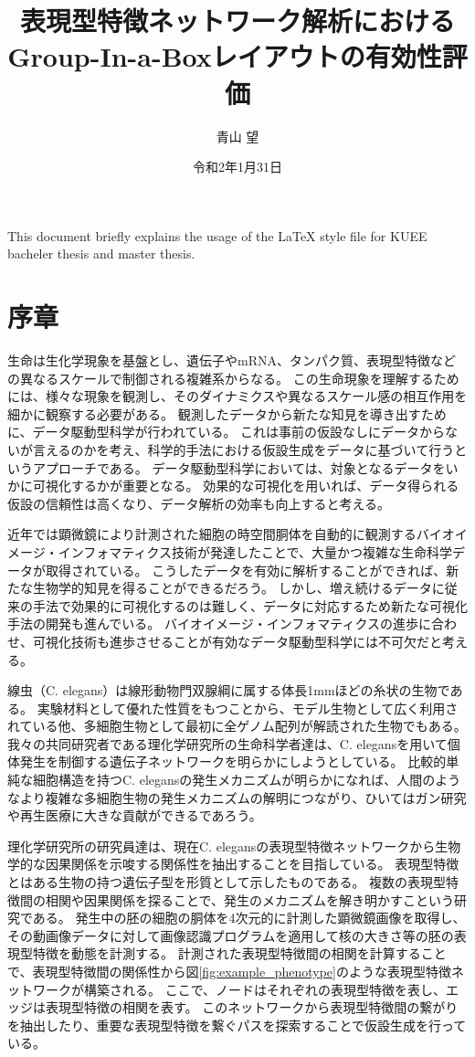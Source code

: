 \documentclass{kuee}
\title{表現型特徴ネットワーク解析におけるGroup-In-a-Boxレイアウトの有効性評価}
\author{青山 望}
\date{令和2年1月31日}
\begin{document}
\maketitle      %
\begin{eabstract}   %
This document briefly explains the usage of the \LaTeX{} style file
for KUEE bacheler thesis and master thesis.
\end{eabstract}
\tableofcontents    %

\chapter{序章}
\label{chap:intro}
生命は生化学現象を基盤とし、遺伝子やmRNA、タンパク質、表現型特徴などの異なるスケールで制御される複雑系からなる。
この生命現象を理解するためには、様々な現象を観測し、そのダイナミクスや異なるスケール感の相互作用を細かに観察する必要がある。
観測したデータから新たな知見を導き出すために、データ駆動型科学が行われている。
これは事前の仮設なしにデータからないが言えるのかを考え、科学的手法における仮設生成をデータに基づいて行うというアプローチである。
データ駆動型科学においては、対象となるデータをいかに可視化するかが重要となる。
効果的な可視化を用いれば、データ得られる仮設の信頼性は高くなり、データ解析の効率も向上すると考える。

近年では顕微鏡により計測された細胞の時空間胴体を自動的に観測するバイオイメージ・インフォマティクス技術が発達したことで、大量かつ複雑な生命科学データが取得されている。
こうしたデータを有効に解析することができれば、新たな生物学的知見を得ることができるだろう。
しかし、増え続けるデータに従来の手法で効果的に可視化するのは難しく、データに対応するため新たな可視化手法の開発も進んでいる。
バイオイメージ・インフォマティクスの進歩に合わせ、可視化技術も進歩させることが有効なデータ駆動型科学には不可欠だと考える。

線虫（C. elegans）は線形動物門双腺綱に属する体長1mmほどの糸状の生物である。
実験材料として優れた性質をもつことから、モデル生物として広く利用されている他、多細胞生物として最初に全ゲノム配列が解読された生物でもある。
我々の共同研究者である理化学研究所の生命科学者達は、C. elegansを用いて個体発生を制御する遺伝子ネットワークを明らかにしようとしている。
比較的単純な細胞構造を持つC. elegansの発生メカニズムが明らかになれば、人間のようなより複雑な多細胞生物の発生メカニズムの解明につながり、ひいてはガン研究や再生医療に大きな貢献ができるであろう。

理化学研究所の研究員達は、現在C. elegansの表現型特徴ネットワークから生物学的な因果関係を示唆する関係性を抽出することを目指している。
表現型特徴とはある生物の持つ遺伝子型を形質として示したものである。
複数の表現型特徴間の相関や因果関係を探ることで、発生のメカニズムを解き明かすこという研究である。
発生中の胚の細胞の胴体を4次元的に計測した顕微鏡画像を取得し、その動画像データに対して画像認識プログラムを適用して核の大きさ等の胚の表現型特徴を動態を計測する。
計測された表現型特徴間の相関を計算することで、表現型特徴間の関係性から図\ref{fig:example_phenotype}のような表現型特徴ネットワークが構築される。
ここで、ノードはそれぞれの表現型特徴を表し、エッジは表現型特徴の相関を表す。
このネットワークから表現型特徴間の繋がりを抽出したり、重要な表現型特徴を繋ぐパスを探索することで仮設生成を行っている。
\end{document}
